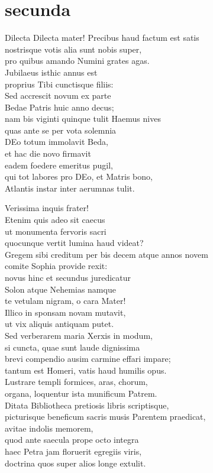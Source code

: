 \documentclass[tocstyle=ref-genre]{ees}
\begin{document}
{\part{secunda}

\begin{movement}{Dilecta}
  Dilecta mater! Precibus haud factum est satis\\
  nostrisque votis alia sunt nobis super,\\
  pro quibus amando Numini grates agas.\\
  Jubilaeus isthic annus est\\
  proprius Tibi cunctisque filiis:\\
  Sed accrescit novum ex parte\\
  Bedae Patris huic anno decus;\\
  nam bis viginti quinque tulit Haemus nives\\
  quas ante se per vota solemnia\\
  DEo totum immolavit Beda,\\
  et hac die novo firmavit\\
  eadem foedere emeritus pugil,\\
  qui tot labores pro DEo, et Matris bono,\\
  Atlantis instar inter aerumnas tulit.

  Verissima inquis frater!\\
  Etenim quis adeo sit caecus\\
  ut monumenta fervoris sacri\\
  quocunque vertit lumina haud videat?\\
  Gregem sibi creditum per bis decem atque annos novem\\
  comite Sophia provide rexit:\\
  novus hinc et secundus juredicatur\\
  Solon atque Nehemias namque\\
  te vetulam nigram, o cara Mater!\\
  Illico in sponsam novam mutavit,\\
  ut vix aliquis antiquam putet.\\
  Sed verberarem maria Xerxis in modum,\\
  si cuncta, quae sunt laude dignissima\\
  brevi compendio ausim carmine effari impare;\\
  tantum est Homeri, vatis haud humilis opus.\\
  Lustrare templi formices, aras, chorum,\\
  organa, loquentur ista munificum Patrem.\\
  Ditata Bibliotheca pretiosis libris scriptisque,\\
  picturisque beneficum sacris musis Parentem praedicat,\\
  avitae indolis memorem,\\
  quod ante saecula prope octo integra\\
  haec Petra jam floruerit egregiis viris,\\
  doctrina quos super alios longe extulit.


\end{movement}}
\end{document}
